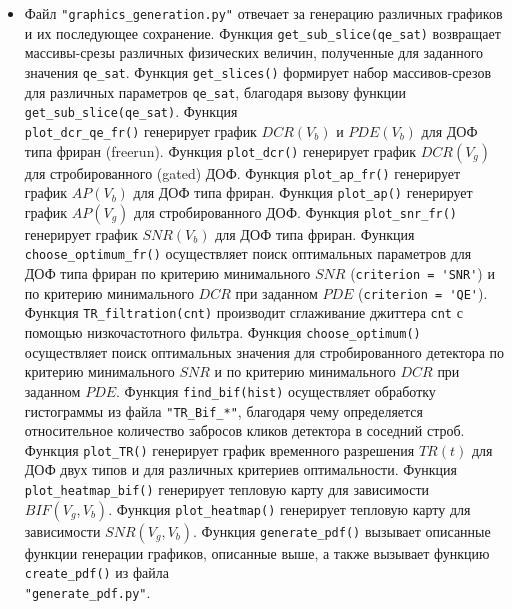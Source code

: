 \documentclass[12pt]{article}
\begin{document}
\begin{itemize}
   \item Файл \verb|"graphics_generation.py"| отвечает за генерацию различных графиков и их последующее сохранение. Функция \verb|get_sub_slice(qe_sat)| возвращает массивы-срезы различных физических величин, полученные для заданного значения \verb|qe_sat|. Функция \verb|get_slices()| формирует набор массивов-срезов для различных параметров \verb|qe_sat|, благодаря  вызову функции \verb|get_sub_slice(qe_sat)|. Функция  \\ \verb|plot_dcr_qe_fr()| генерирует график $DCR(V_b)$ и $PDE(V_b)$ для ДОФ типа фриран  (freerun).  Функция \verb|plot_dcr()| генерирует график $DCR(V_g)$ для стробированного (gated) ДОФ. Функция \verb|plot_ap_fr()| генерирует график $AP(V_b)$ для ДОФ типа фриран. Функция \verb|plot_ap()| генерирует график $AP(V_g)$ для стробированного ДОФ. Функция \verb|plot_snr_fr()| генерирует график $SNR(V_b)$ для ДОФ типа фриран. Функция \verb|choose_optimum_fr()| осуществляет поиск оптимальных параметров для ДОФ типа фриран по критерию минимального $SNR$ (\verb|criterion = 'SNR'|) и по критерию минимального $DCR$ при заданном $PDE$ (\verb|criterion = 'QE'|). Функция \verb|TR_filtration(cnt)| производит сглаживание джиттера \verb|cnt| с помощью низкочастотного фильтра. Функция \verb|choose_optimum()| осуществляет поиск оптимальных значения для стробированного детектора по критерию минимального $SNR$ и по критерию минимального $DCR$ при заданном $PDE$.  Функция \verb|find_bif(hist)| осуществляет обработку гистограммы из файла \verb|"TR_Bif_*"|, благодаря чему определяется относительное количество забросов кликов детектора в соседний строб. Функция \verb|plot_TR()| генерирует график временного разрешения $TR(t)$ для ДОФ двух типов и для различных критериев оптимальности.  Функция \\ \verb|plot_heatmap_bif()| генерирует тепловую карту для зависимости $BIF(V_g, V_b)$. Функция \verb|plot_heatmap()| генерирует тепловую карту для зависимости $SNR(V_g, V_b)$. Функция \verb|generate_pdf()| вызывает описанные функции генерации графиков, описанные выше, а также вызывает функцию \verb|create_pdf()| из файла \\ \verb|"generate_pdf.py"|. 


\end{itemize}
\end{document}
